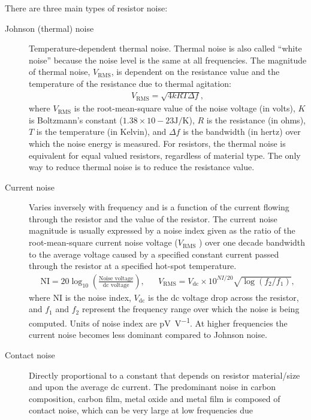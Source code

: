 \documentclass[../../document]{subfiles}
\begin{document}
There are three main types of resistor noise: \cite{practical_electronics}
\begin{description}
	\item[Johnson (thermal) noise]  Temperature-dependent thermal noise. Thermal
		noise is also called \enquote{white noise} because the noise level is the
		same at all frequencies. The magnitude of thermal noise,
		\(V_{\text{RMS}}\), is dependent on the resistance value and the
		temperature of the resistance due to thermal agitation:
		\begin{gather}
			V_{\text{RMS}} = \sqrt{4kRT\Delta f},
		\end{gather}
		where \(V_{\text{RMS}}\) is the root-mean-square value of the noise voltage
		(in volts), \(K\)  is Boltzmann’s constant (\(1.38 ×
		10-23\unit{\joule\per\kelvin}\)), \(R\)  is the resistance (in ohms), \(T\)
		is the temperature (in Kelvin), and \(\Delta f\)  is the bandwidth (in
		hertz) over which the noise energy is measured. For resistors, the thermal
		noise is equivalent for equal valued resistors, regardless of material
		type. The only way to reduce thermal noise is to reduce the resistance
		value.
	\item[Current noise] Varies inversely with frequency and is a function of the
		current flowing through the resistor and the value of the resistor.
		The current noise magnitude is usually expressed by a noise index given as
		the ratio of the root-mean-square current noise voltage (\(V_{\text{RMS}}\) ) over one
		decade bandwidth to the average voltage caused by a specified constant
		current passed through the resistor at a specified hot-spot
		temperature.
		\begin{align}
			\mathrm{NI} = 20\log_{10}\left(\frac{\text{Noise voltage}}{\text{dc voltage}}\right), &&
			V_{\text{RMS}} = V_{\text{dc}}\times 10^{NI/20}\sqrt{\log(f_2/f_1)},
		\end{align}
		where \(\mathrm{NI}\) is the noise index, \(V_{\text{dc}}\) is the dc
		voltage drop across the resistor, and \(f_1\)  and \(f_2\) represent the
		frequency range over which the noise is being computed. Units of noise
		index are \unit{\pico\volt\per\volt}. At higher frequencies the current
		noise becomes less dominant compared to Johnson noise.
	\item[Contact noise] Directly proportional to a constant that depends on
		resistor material/size and upon the average dc current. The predominant
		noise in carbon composition, carbon film, metal oxide and metal film is
		composed of contact noise, which can be very large at low frequencies due

\end{description}
\end{document}
